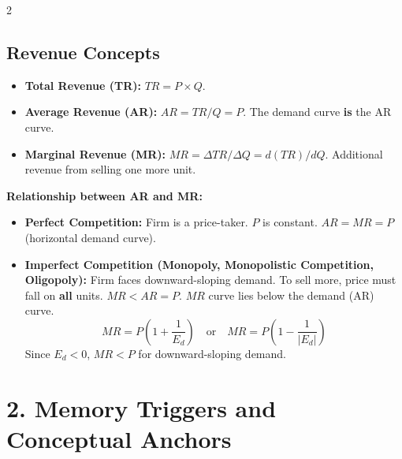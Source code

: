 \documentclass[10pt,a4paper]{article}
\begin{document}
\begin{multicols}{2}
\subsection*{Revenue Concepts}
\begin{itemize}[leftmargin=*,nosep]
    \item \textbf{Total Revenue (TR):} $TR = P \times Q$.
    \item \textbf{Average Revenue (AR):} $AR = TR/Q = P$. The demand curve \textbf{is} the AR curve.
    \item \textbf{Marginal Revenue (MR):} $MR = \Delta TR / \Delta Q = d(TR)/dQ$. Additional revenue from selling one more unit.
\end{itemize}

\textbf{Relationship between AR and MR:}
\begin{itemize}[leftmargin=*,nosep]
    \item \textbf{Perfect Competition:} Firm is a price-taker. $P$ is constant. $AR = MR = P$ (horizontal demand curve).
    \item \textbf{Imperfect Competition (Monopoly, Monopolistic Competition, Oligopoly):} Firm faces downward-sloping demand. To sell more, price must fall on \textbf{all} units. $MR < AR = P$. $MR$ curve lies below the demand (AR) curve.
    \[
    MR = P \left(1 + \frac{1}{E_d}\right) \quad \text{or} \quad MR = P \left(1 - \frac{1}{|E_d|}\right)
    \]
    Since $E_d < 0$, $MR < P$ for downward-sloping demand.
\end{itemize}

\section*{2. Memory Triggers and Conceptual Anchors}


\end{multicols}
\end{document}
